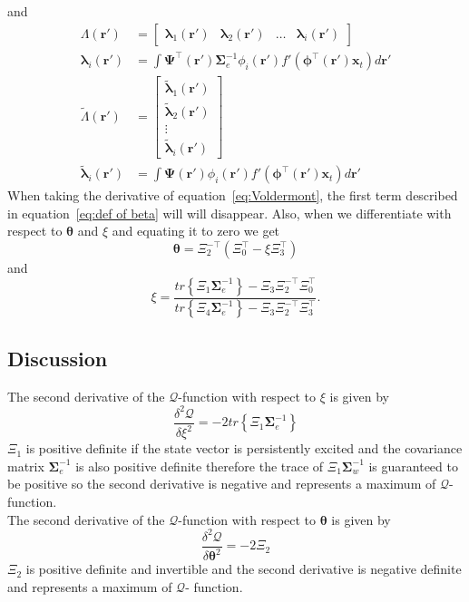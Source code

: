 \documentclass[]{article}
\begin{document}
and
\begin{align}
	 \Lambda(\mathbf r')&=\begin{bmatrix}\boldsymbol \lambda_1(\mathbf r') & \boldsymbol \lambda_2(\mathbf r')& \dots &\boldsymbol \lambda_i(\mathbf r')\end{bmatrix} \\
	 \boldsymbol\lambda_i(\mathbf r')&=\int \boldsymbol \Psi^\top(\mathbf r')\boldsymbol \Sigma_e^{-1}\phi_i(\mathbf r')f'(\boldsymbol\phi^\top(\mathbf r')\mathbf x_t)d\mathbf r'\\
	\tilde{\Lambda}(\mathbf r')&=\begin{bmatrix}\tilde{\boldsymbol \lambda}_1(\mathbf r') \\ \tilde{\boldsymbol \lambda}_2(\mathbf r') \\ \vdots \\ \tilde{\boldsymbol \lambda}_i(\mathbf r')\end{bmatrix} \\
	 \tilde{\boldsymbol \lambda}_i(\mathbf r')&=\int \boldsymbol \Psi(\mathbf r')\phi_i(\mathbf r')f'(\boldsymbol\phi^\top(\mathbf r')\mathbf x_t)d\mathbf r'
\end{align}
When taking the derivative of equation~\ref{eq:Voldermont}, the first term described in equation~\ref{eq:def of beta} will will disappear. Also, when we differentiate with respect to $\boldsymbol\theta$ and $\xi$ and equating it to zero we get
\begin{equation}
 \boldsymbol \theta=\Xi_2^{-\top}\left(\Xi_0^\top-\xi\Xi_3^\top \right)
\end{equation}
and
\begin{equation}
 \xi=\frac{tr\left\lbrace \Xi_1 \boldsymbol\Sigma_e^{-1}\right\rbrace-\Xi_3\Xi_2^{-\top}\Xi_0^\top}{tr\left\lbrace \Xi_4 \boldsymbol\Sigma_e^{-1}\right\rbrace-\Xi_3\Xi_2^{-\top}\Xi_3^\top}.
\end{equation}
\subsection{Discussion}
The second derivative of the $\mathcal Q$-function with respect to $\xi$ is given by
\begin{equation}
 \frac{\delta^2 \mathcal Q}{\delta \xi^2}=-2 tr \left\lbrace\Xi_1\boldsymbol\Sigma_e^{-1} \right\rbrace
\end{equation}
$\Xi_1 $ is positive definite if the state vector is persistently excited and the covariance matrix $\boldsymbol\Sigma_e^{-1}$ is also positive definite therefore the trace of $\Xi_1\boldsymbol\Sigma_w^{-1}$ is guaranteed to be positive so the second derivative is negative and represents a maximum of $\mathcal Q$-function.\\
The second derivative of the $\mathcal Q$-function with respect to $\boldsymbol \theta$ is given by
\begin{equation}
 \frac{\delta^2 \mathcal Q}{\delta \boldsymbol\theta^2}=-2 \Xi_2 
\end{equation}
$\Xi_2$ is positive definite and invertible and the second derivative is negative definite and represents a maximum of $\mathcal Q$- function.
\end{document}
